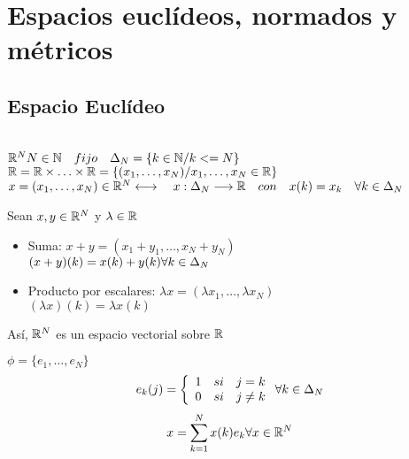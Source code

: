 \chapter{Espacios euclídeos, normados y métricos}
\section{Espacio Euclídeo}
    \begin{definicion} \\ 

    \noindent
        $\mathbb R^N \\ N \in \mathbb N\quad fijo \quad \Delta_N = \{k \in \mathbb N / k <= N\}$ \newline
        $\mathbb R = \mathbb R \times \ldots \times \mathbb R = \{ (x_1, \ldots, x_N) / x_1, \ldots , x_N \in \mathbb R\} $\newline
        $x = (x_1, \ldots , x_N) \in \mathbb R^N \\ \longleftrightarrow \quad x : \Delta_N \longrightarrow \mathbb R \quad con \quad x(k) = x_k \quad \forall k \in \Delta_N$
    \end{definicion}
    \begin{definicion}
        Sean $x, y \in \mathbb R^N$ y  $\lambda \in \mathbb R$
        \begin{itemize}
            \item Suma:
            $ x + y = (x_1+y_1, \ldots, x_N + y_N)$ \\
            $ (x+y)(k) = x(k) + y(k) \\ \forall k \in \Delta_N$
            \item Producto por escalares:
            $\lambda x = (\lambda x_1, \ldots , \lambda x_N)$ \\
            $(\lambda x)(k) =  \lambda x(k)$
        \end{itemize}
    \end{definicion}
    Así, $\mathbb R^N$ es un espacio vectorial sobre $\mathbb R$

    
    \begin{definicion}
        $\phi = \{ e_1, \ldots , e_N\}$ 
        $$e_k(j) = \left\{ \begin{array}{lll}
            1 & si & j=k\\
            0 & si & j\neq k\\
        \end{array} \right. \\ \forall k \in \Delta_N$$
        $$x = \sum_{k=1}^N x(k)e_k \\ \forall x \in \mathbb R^N$$
    \end{definicion}
        

